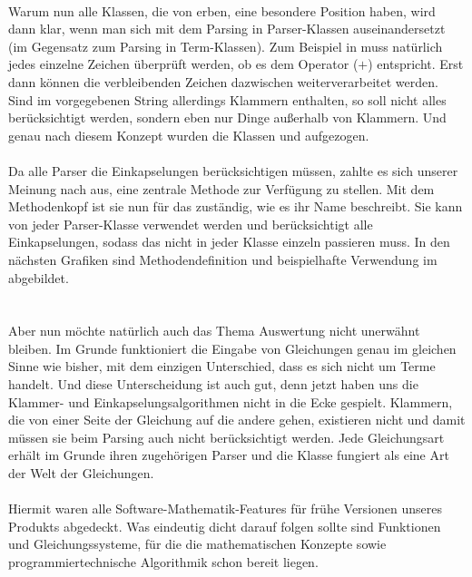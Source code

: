 \\
Warum nun alle Klassen, die von  erben, eine besondere Position haben, wird dann klar, wenn man sich mit dem Parsing in Parser-Klassen auseinandersetzt (im Gegensatz zum Parsing in Term-Klassen). Zum Beispiel in  muss natürlich jedes einzelne Zeichen überprüft werden, ob es dem Operator ($+$) entspricht. Erst dann können die verbleibenden Zeichen dazwischen weiterverarbeitet werden. Sind im vorgegebenen String allerdings Klammern enthalten, so soll nicht alles berücksichtigt werden, sondern eben nur Dinge außerhalb von Klammern. Und genau nach diesem Konzept wurden die Klassen  und  aufgezogen.\\
\\
Da alle Parser die Einkapselungen berücksichtigen müssen, zahlte es sich unserer Meinung nach aus, eine zentrale Methode zur Verfügung zu stellen. Mit dem Methodenkopf  ist sie nun für das zuständig, wie es ihr Name beschreibt. Sie kann von jeder Parser-Klasse verwendet werden und berücksichtigt alle Einkapselungen, sodass das nicht in jeder Klasse einzeln passieren muss. In den nächsten Grafiken sind Methodendefinition und beispielhafte Verwendung im  abgebildet.\\
\\
\ \\
Aber nun möchte natürlich auch das Thema Auswertung nicht unerwähnt bleiben. Im Grunde funktioniert die Eingabe von Gleichungen genau im gleichen Sinne wie bisher, mit dem einzigen Unterschied, dass es sich nicht um Terme handelt. Und diese Unterscheidung ist auch gut, denn jetzt haben uns die Klammer- und Einkapselungsalgorithmen nicht in die Ecke gespielt. Klammern, die von einer Seite der Gleichung auf die andere gehen, existieren nicht und damit müssen sie beim Parsing auch nicht berücksichtigt werden. Jede Gleichungsart erhält im Grunde ihren zugehörigen Parser und die Klasse  fungiert als eine Art  der Welt der Gleichungen.\\
\\
Hiermit waren alle Software-Mathematik-Features für frühe Versionen unseres Produkts abgedeckt. Was eindeutig dicht darauf folgen sollte sind Funktionen und Gleichungssysteme, für die die mathematischen Konzepte sowie programmiertechnische Algorithmik schon bereit liegen.